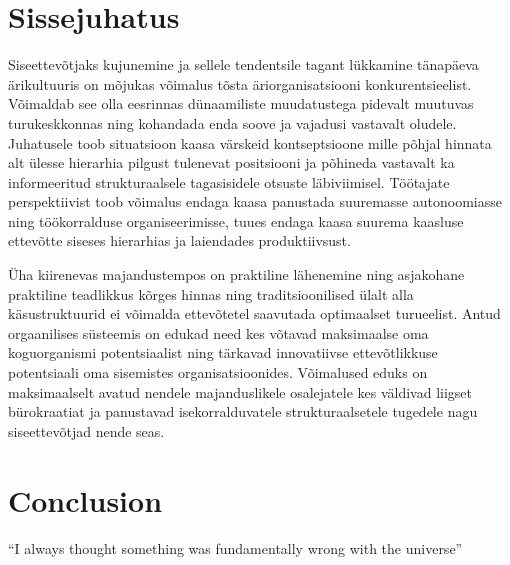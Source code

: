 \documentclass{EUASThesis}
\begin{document}


\vspace{\baselineskip}
\tableofcontents
\vspace{\baselineskip}

\section{Sissejuhatus}
Siseettevõtjaks kujunemine ja sellele tendentsile tagant lükkamine tänapäeva ärikultuuris on mõjukas võimalus tõsta äriorganisatsiooni konkurentsieelist. Võimaldab see olla eesrinnas dünaamiliste muudatustega pidevalt muutuvas turukeskkonnas ning kohandada enda soove ja vajadusi vastavalt oludele. Juhatusele toob situatsioon kaasa värskeid kontseptsioone mille põhjal hinnata alt ülesse hierarhia pilgust tulenevat positsiooni ja põhineda vastavalt ka informeeritud strukturaalsele tagasisidele otsuste läbiviimisel. Töötajate perspektiivist toob võimalus endaga kaasa panustada suuremasse autonoomiasse ning töökorralduse organiseerimisse, tuues endaga kaasa suurema kaasluse ettevõtte siseses hierarhias ja laiendades produktiivsust.\par

Üha kiirenevas majandustempos on praktiline lähenemine ning asjakohane praktiline teadlikkus kõrges hinnas ning traditsioonilised ülalt alla käsustruktuurid ei võimalda ettevõtetel saavutada optimaalset turueelist. Antud orgaanilises süsteemis on edukad need kes võtavad maksimaalse oma koguorganismi potentsiaalist ning tärkavad innovatiivse ettevõtlikkuse potentsiaali oma sisemistes organisatsioonides. Võimalused eduks on maksimaalselt avatud nendele majanduslikele osalejatele kes väldivad liigset bürokraatiat ja panustavad isekorralduvatele strukturaalsetele tugedele nagu siseettevõtjad nende seas. \par


\section{Conclusion}
``I always thought something was fundamentally wrong with the universe''
\end{document}
